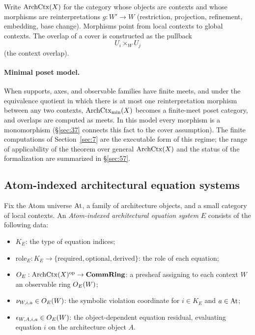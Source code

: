 \begin{definition}\label{def:contextcategory}
Write $\mathrm{ArchCtx}(X)$ for the category whose objects are contexts and whose
morphisms are reinterpretations $g:W'\to W$ (restriction, projection,
refinement, embedding, base change). Morphisms point from local contexts
to global contexts. The overlap of a cover is constructed as the pullback
\[
U_i\times_W U_j
\]
(the context overlap).
\end{definition}

\paragraph{Minimal poset model.}
When supports, axes, and observable families have finite meets, and under
the equivalence quotient in which there is at most one reinterpretation
morphism between any two contexts, $\mathrm{ArchCtx}_{\min}(X)$ becomes a
finite-meet poset category, and overlaps are computed as meets. In this
model every morphism is a monomorphism (\S\ref{sec:37} connects this fact
to the cover assumption). The finite computations of Section~\ref{sec:7}
are the executable form of this regime; the range of applicability of the
theorem over general $\mathrm{ArchCtx}(X)$ and the status of the formalization
are summarized in \S\ref{sec:57}.

\subsection{Atom-indexed architectural equation systems}\label{sec:34}

\begin{definition}\label{def:equationsystem}
Fix the Atom universe $\mathrm{At}$, a family of architecture objects, and a
small category of local contexts. An \emph{Atom-indexed architectural
equation system} $E$ consists of the following data:
\begin{itemize}
\item $K_E$: the type of equation indices;
\item $\mathrm{role}_E : K_E \to \{\mathrm{required}, \mathrm{optional},
      \mathrm{derived}\}$: the role of each equation;
\item $O_{E} : \mathrm{ArchCtx}(X)^{\mathrm{op}} \to \mathbf{CommRing}$: a
      presheaf assigning to each context $W$ an observable ring
      $O_{E}(W)$;
\item $\nu_{W,i,a} \in O_{E}(W)$: the symbolic violation coordinate for
      $i \in K_E$ and $a \in \mathrm{At}$;
\item $\epsilon_{W,A,i,a} \in O_{E}(W)$: the object-dependent equation
      residual, evaluating equation $i$ on the architecture object $A$.
\end{itemize}
\end{definition}

